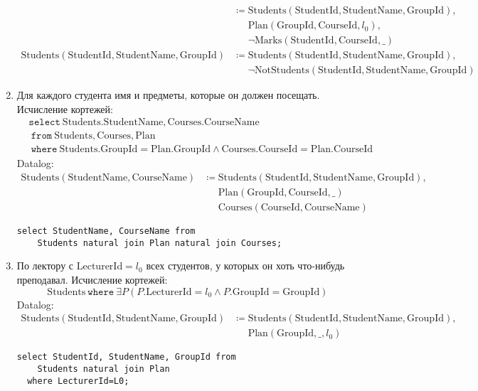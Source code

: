 \documentclass{article}
\newcommand{\Students}{\mathrm{Students}}
\newcommand{\StudentId}{\mathrm{StudentId}}
\newcommand{\StudentName}{\mathrm{StudentName}}
\newcommand{\GroupId}{\mathrm{GroupId}}
\newcommand{\Courses}{\mathrm{Courses}}
\newcommand{\CourseId}{\mathrm{CourseId}}
\newcommand{\CourseName}{\mathrm{CourseName}}
\newcommand{\Plan}{\mathrm{Plan}}
\newcommand{\LecturerId}{\mathrm{LecturerId}}
\newcommand{\Marks}{\mathrm{Marks}}
\newcommand{\select}{\mathtt{select}~}
\newcommand{\from}{~\mathtt{from}~}
\newcommand{\where}{~\mathtt{where}~}
\newcommand{\poloneq}{\mathrel{\phantom{\coloneq}}}
\begin{document}
\begin{enumerate}
\begin{align*}
        &\coloneq \Students(\StudentId, \StudentName, \GroupId), \\
        &\poloneq \Plan(\GroupId, \CourseId, l_0), \\
        &\poloneq \neg \Marks(\StudentId, \CourseId, \_) \\
        \Students(\StudentId, \StudentName, \GroupId)
        &\coloneq \Students(\StudentId, \StudentName, \GroupId), \\
        &\poloneq
            \neg \mathrm{NotStudents}(\StudentId, \StudentName, \GroupId)
    \end{align*}
    \item Для каждого студента имя и предметы, которые он должен посещать.
    Исчисление кортежей:
    \begin{align*}
        &\select \Students.\StudentName, \Courses.\CourseName \\
        &\from \Students, \Courses, \Plan \\
        &\where \Students.\GroupId = \Plan.\GroupId
            \land \Courses.\CourseId = \Plan.\CourseId
    \end{align*}
    Datalog:
    \begin{align*}
        \Students(\StudentName, \CourseName)
        &\coloneq \Students(\StudentId, \StudentName, \GroupId), \\
        &\poloneq \Plan(\GroupId, \CourseId, \_) \\
        &\poloneq \Courses(\CourseId, \CourseName)
    \end{align*}
    \begin{verbatim}
select StudentName, CourseName from
    Students natural join Plan natural join Courses;
    \end{verbatim}
    \item По лектору с $\LecturerId=l_0$ всех студентов,
        у которых он хоть что-нибудь преподавал.
    Исчисление кортежей:
    \[
        \Students \where \exists P (P.\LecturerId = l_0
        \land P.\GroupId = \GroupId)
    \]
    Datalog:
    \begin{align*}
        \Students(\StudentId, \StudentName, \GroupId)
        &\coloneq \Students(\StudentId, \StudentName, \GroupId), \\
        &\poloneq \Plan(\GroupId, \_, l_0)
    \end{align*}
    \begin{verbatim}
select StudentId, StudentName, GroupId from
    Students natural join Plan
  where LecturerId=L0;
    \end{verbatim}

\end{enumerate}
\end{document}
